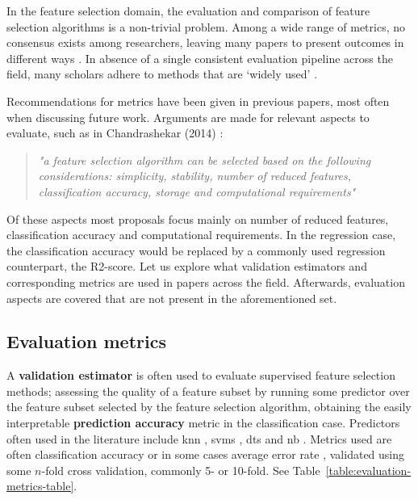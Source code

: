 \documentclass{article}
\begin{document}
In the feature selection domain, the evaluation and comparison of feature selection algorithms is a non-trivial problem. Among a wide range of metrics, no consensus exists among researchers, leaving many papers to present outcomes in different ways \citep{guyon_introduction_2003}. In absence of a single consistent evaluation pipeline across the field, many scholars adhere to methods that are `widely used' \citep{solorio-fernandez_review_2020} \citep{li_feature_2017}.

Recommendations for metrics have been given in previous papers, most often when discussing future work. Arguments are made for relevant aspects to evaluate, such as in Chandrashekar (2014) \citep{chandrashekar_survey_2014}:

\begin{quote}\textit{"a feature selection algorithm can be selected based on the following considerations: simplicity, stability, number of reduced features, classification accuracy, storage and computational requirements"}\end{quote}

Of these aspects most proposals focus mainly on number of reduced features, classification accuracy and computational requirements. In the regression case, the classification accuracy would be replaced by a commonly used regression counterpart, the R2-score. Let us explore what validation estimators and corresponding metrics are used in papers across the field. Afterwards, evaluation aspects are covered that are not present in the aforementioned set.

\subsection{Evaluation metrics}
A \textbf{validation estimator} is often used to evaluate supervised feature selection methods; assessing the quality of a feature subset by running some predictor over the feature subset selected by the feature selection algorithm, obtaining the easily interpretable \textbf{prediction accuracy} metric in the classification case. Predictors often used in the literature include \gls{knn} \citep{al-tashi_review_2020} \citep{mafarja_dragonfly_2020}, \glspl{svm} \citep{chandrashekar_survey_2014}, \glspl{dt} \citep{li_feature_2017} and \gls{nb} \citep{koller_toward_1996}. Metrics used are often classification accuracy or in some cases average error rate \citep{khurma_evolopy-fs_2020}, validated using some $n$-fold cross validation, commonly 5- or 10-fold. See Table~\ref{table:evaluation-metrics-table}.
\end{document}
